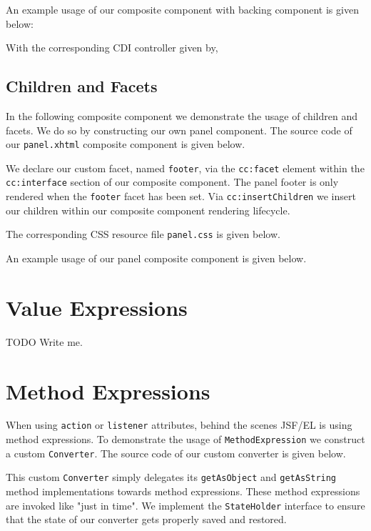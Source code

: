 An example usage of our composite component with backing component is given below:

With the corresponding CDI controller given by,


\subsection{Children and Facets}
In the following composite component we demonstrate the usage of children and facets.
We do so by constructing our own panel component.
The source code of our \texttt{panel.xhtml} composite component is given below.

We declare our custom facet, named \texttt{footer},
via the \texttt{cc:facet} element within the \texttt{cc:interface} section of our composite component.
The panel footer is only rendered when the \texttt{footer} facet has been set.
Via \texttt{cc:insertChildren} we insert our children within our composite component rendering lifecycle.

The corresponding CSS resource file \texttt{panel.css} is given below.


An example usage of our panel composite component is given below.


\section{Value Expressions}
\begin{TODO}{TODO}
	Write me.
\end{TODO}

\section{Method Expressions}
When using \texttt{action} or \texttt{listener} attributes, behind the scenes JSF/EL is using method expressions.
To demonstrate the usage of \texttt{MethodExpression} we construct a custom \texttt{Converter}.
The source code of our custom converter is given below.

This custom \texttt{Converter} simply delegates its \texttt{getAsObject} and \texttt{getAsString} method implementations towards method expressions.
These method expressions are invoked like "just in time".
We implement the \texttt{StateHolder} interface to ensure that the state of our converter gets properly saved and restored.

